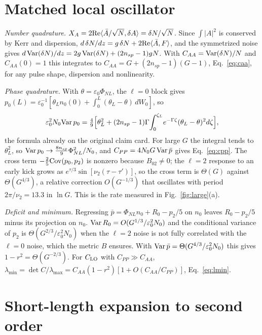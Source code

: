 \documentclass[aps,pra,twocolumn,superscriptaddress,nofootinbib,floatfix]{revtex4-2}
\newcommand{\PNL}{\Phi_{NL}}
\newcommand{\nsp}{n_{sp}}
\newcommand{\eps}{\varepsilon_0}
\begin{document}
\section{Matched local oscillator}\label{app:lo}

\textit{Number quadrature.} $X_A=2{\rm Re}\langle\bar A/\sqrt N,\delta A\rangle=\delta N/\sqrt N$. Since $\int|A|^2$ is
conserved by Kerr and dispersion, $d\,\delta N/dz=g\,\delta N+2{\rm Re}\langle\bar A,F\rangle$, and the symmetrized noise
gives $d\,{\rm Var}(\delta N)/dz=2g\,{\rm Var}(\delta N)+(2\nsp-1)gN$. With $C_{AA}={\rm Var}(\delta N)/N$ and $C_{AA}(0)=1$
this integrates to $C_{AA}=G+(2\nsp-1)(G-1)$, Eq.~\eqref{eq:caa}, for any pulse shape, dispersion and nonlinearity.

\textit{Phase quadrature.} With $\theta=\eps\PNL$, the $\ell=0$ block gives $p_0(L)=\eps^{-1}[\theta_Ln_0(0)+\int_0^L(\theta_L-\theta)\,dW_0]$,
so
\begin{equation}
\eps^2N_0{\rm Var}\,p_0=\tfrac49\Big[\theta_L^2+(2\nsp-1)\Gamma\!\int_0^{\zeta_L}\!e^{-\Gamma\zeta}(\theta_L-\theta)^2d\zeta\Big],
\end{equation}
the formula already on the original claim card. For large $G$ the integral tends to $\theta_L^2$, so
${\rm Var}\,p_0\to\frac{8\nsp}9\PNL^2/N_0$, and $C_{PP}=4N_0G\,{\rm Var}\,\bar p$ gives Eq.~\eqref{eq:cpp}. The cross term
$-\frac25{\rm Cov}(p_0,p_2)$ is nonzero because $B_{02}\ne0$; the $\ell=2$ response to an early kick grows as
$e^{\tau/3}\sin[\nu_2(\tau-\tau')]$, so the cross term is $\Theta(G)$ against $\Theta(G^{4/3})$, a relative correction
$O(G^{-1/3})$ that oscillates with period $2\pi/\nu_2=13.3$ in $\ln G$. This is the rate measured in Fig.~\ref{fig:large}(a).

\textit{Deficit and minimum.} Regressing $\bar p=\PNL n_0+R_0-p_2/5$ on $n_0$ leaves $R_0-p_2/5$ minus its projection on
$n_0$. ${\rm Var}\,R_0=O(G^{1/3}/\eps^2N_0)$ and the conditional variance of $p_2$ is $\Theta(G^{2/3}/\eps^2N_0)$ when the
$\ell=2$ noise is not fully correlated with the $\ell=0$ noise, which the metric $B$ ensures. With
${\rm Var}\,\bar p=\Theta(G^{4/3}/\eps^2N_0)$ this gives $1-r^2=\Theta(G^{-2/3})$. For $C_{\rm LO}$ with
$C_{PP}\gg C_{AA}$, $\lambda_{\min}=\det C/\lambda_{\max}=C_{AA}(1-r^2)[1+O(C_{AA}/C_{PP})]$, Eq.~\eqref{eq:lmin}.

\section{Short-length expansion to second order}\label{app:second}
\end{document}
